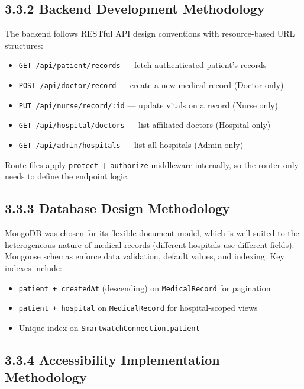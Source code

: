\documentclass[12pt,a4paper]{report}
\begin{document}
\subsection{3.3.2 Backend Development Methodology}

The backend follows RESTful API design conventions with resource-based URL structures:

\begin{itemize}
    \item \texttt{GET /api/patient/records} — fetch authenticated patient's records
    \item \texttt{POST /api/doctor/record} — create a new medical record (Doctor only)
    \item \texttt{PUT /api/nurse/record/:id} — update vitals on a record (Nurse only)
    \item \texttt{GET /api/hospital/doctors} — list affiliated doctors (Hospital only)
    \item \texttt{GET /api/admin/hospitals} — list all hospitals (Admin only)
\end{itemize}

Route files apply \texttt{protect} + \texttt{authorize} middleware internally, so the router only needs to define the endpoint logic.

\subsection{3.3.3 Database Design Methodology}

MongoDB was chosen for its flexible document model, which is well-suited to the heterogeneous nature of medical records (different hospitals use different fields). Mongoose schemas enforce data validation, default values, and indexing. Key indexes include:
\begin{itemize}
    \item \texttt{patient + createdAt} (descending) on \texttt{MedicalRecord} for pagination
    \item \texttt{patient + hospital} on \texttt{MedicalRecord} for hospital-scoped views
    \item Unique index on \texttt{SmartwatchConnection.patient}
\end{itemize}

\subsection{3.3.4 Accessibility Implementation Methodology}
\end{document}

